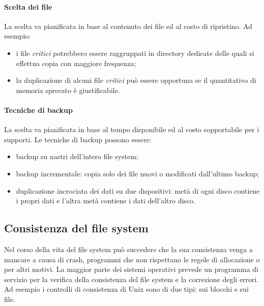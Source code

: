 \documentclass[12pt, letterpaper]{report}
\begin{document}
	\paragraph{Scelta dei file} La scelta va pianificata in base al contenuto dei file ed al costo di ripristino. Ad esempio:
	\begin{itemize}
		\item i file \textit{critici} potrebbero essere raggruppati in directory dedicate delle quali si effettua copia con maggiore frequenza;
		\item la duplicazione di alcuni file \textit{critici} può essere opportuna se il quantitativo di memoria sprecato è giustificabile.
	\end{itemize}
	\paragraph{Tecniche di backup} La scelta va pianificata in base al tempo disponibile ed al costo sopportabile per i supporti. Le tecniche di backup possono essere:
	\begin{itemize}
		\item backup su nastri dell'intero file system;
		\item backup incrementale: copia solo dei file nuovi o modificati dall'ultimo backup;
		\item duplicazione incrociata dei dati su due dispositivi: metà di ogni disco contiene i propri dati e l'altra metà contiene i dati dell'altro disco.
	\end{itemize}
	\subsection{Consistenza del file system}
	 Nel corso della vita del file system può succedere che la sua consistenza venga a mancare a causa di crash, programmi che non rispettano le regole di allocazione o per altri motivi. La maggior parte dei sistemi operativi prevede un programma di servizio per la verifica della consistenza del file system e la correzione degli errori. \\
	 Ad esempio i controlli di consistenza di Unix sono di due tipi: sui blocchi e sui file.
\end{document}
